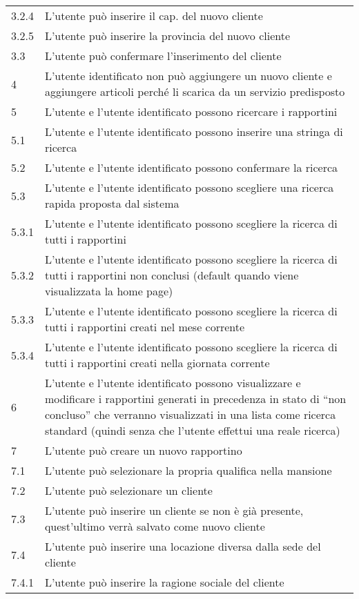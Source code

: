 \begin{longtable}{||p{} p{10.55cm}||}
		3.2.4 & L’utente può inserire il cap. del nuovo cliente\\
		3.2.5 & L’utente può inserire la provincia del nuovo cliente\\
		3.3 & L’utente può confermare l’inserimento del cliente\\
		\hline
		4 & L’utente identificato non può aggiungere un nuovo cliente e aggiungere articoli perché li scarica da un servizio predisposto \\
		\hline
		5 &  L’utente e l’utente identificato possono ricercare i rapportini\\
		5.1 & L’utente e l’utente identificato possono inserire una stringa di ricerca\\
		5.2 & L’utente e l’utente identificato possono confermare la ricerca\\
		5.3 & L’utente e l’utente identificato possono scegliere una ricerca rapida proposta dal sistema\\
		5.3.1 & L’utente e l’utente identificato possono scegliere la ricerca di tutti i rapportini\\
		5.3.2 & L’utente e l’utente identificato possono scegliere la ricerca di tutti i rapportini non conclusi (default quando viene visualizzata la home page)\\
		5.3.3 & L’utente e l’utente identificato possono scegliere la ricerca di tutti i rapportini creati nel mese corrente\\
		5.3.4 & L’utente e l’utente identificato possono scegliere la ricerca di tutti i rapportini creati nella giornata corrente\\ 
		\hline
		6 & L’utente e l’utente identificato possono visualizzare e modificare i rapportini generati in precedenza in stato di “non concluso” che verranno visualizzati in una lista come ricerca standard (quindi senza che l’utente effettui una reale ricerca)\\
		\hline
		7 & L’utente può creare un nuovo rapportino\\
		7.1 & L’utente può selezionare la propria qualifica nella mansione\\
		7.2 & L’utente può selezionare un cliente\\
		7.3 & L’utente può inserire un cliente se non è già presente, quest’ultimo verrà salvato come nuovo cliente\\
		7.4 & L’utente può inserire una locazione diversa dalla sede del cliente\\
		7.4.1 & L’utente può inserire la ragione sociale del cliente\\

\end{longtable}
